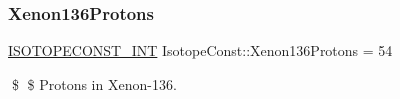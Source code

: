 \subsubsection{\texorpdfstring{Xenon136\+Protons}{Xenon136Protons}}
{\footnotesize\ttfamily \mbox{\hyperlink{group___isotope_const-_macros_ga5f18360b3e99483a35c32d789e62621c}{I\+S\+O\+T\+O\+P\+E\+C\+O\+N\+S\+T\+\_\+\+I\+NT}} Isotope\+Const\+::\+Xenon136\+Protons = 54}

\$ \$ Protons in Xenon-\/136. 